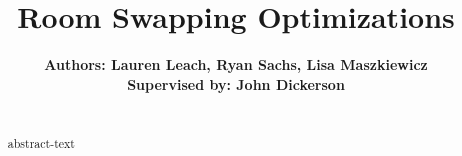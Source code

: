 \documentclass[12pt]{article}
\title{Room Swapping Optimizations}
\begin{document}
\maketitle

\begin{center}
\author{\textbf {Authors: Lauren Leach, Ryan Sachs, Lisa Maszkiewicz\\ \footnotesize Supervised by: John Dickerson\\ }} 
 

\begin{abstract}
   \\abstract-text\\ \\ \\ \\
\end{abstract}

\end{center}
\end{document}
